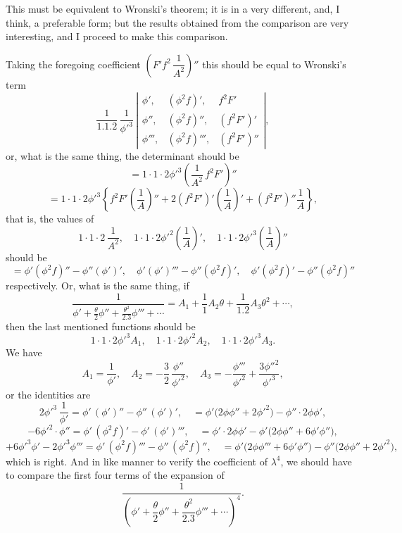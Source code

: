 \documentclass[11pt]{article}
\begin{document}
This must be equivalent to Wronski's theorem; it is in a very different, and, I think, a preferable form; but the results obtained from the comparison are very interesting, and I proceed to make this comparison.

Taking the foregoing coefficient $\left(F'f^{2}\,\dfrac{1}{A^{2}}\right)''$ this should be equal to Wronski's term
\[
\frac{1}{1.1.2}\,\frac{1}{\phi'^{3}}\,\left|\begin{array}{ccc}\phi',&(\phi^{2}f)',&f^{2}F'\\ \phi'',&(\phi^{2}f)'',&(f^{2}F')'\\ \phi''',&(\phi^{2}f)''',&(f^{2}F')''\end{array}\right|,
\]
or, what is the same thing, the determinant should be
\[
= 1\cdot 1\cdot 2\phi'^{3}\!\left(\frac{1}{A^{2}}\,f^{2}F'\right)''
\]
\[
= 1\cdot 1\cdot 2\phi'^{3}\!\left\{f^{2}F'\!\left(\frac{1}{A}\right)'' + 2(f^{2}F')'\!\left(\frac{1}{A}\right)' + (f^{2}F')''\!\frac{1}{A}\right\},
\]
that is, the values of
\[
1\cdot 1\cdot 2\,\frac{1}{A^{2}},\quad 1\cdot 1\cdot 2\phi'^{2}\!\left(\frac{1}{A}\right)',\quad 1\cdot 1\cdot 2\phi'^{3}\!\left(\frac{1}{A}\right)''
\]
should be
\[
= \phi'(\phi^{2}f)'' - \phi''(\phi')',\quad \phi'(\phi')''' - \phi''(\phi^{2}f)',\quad \phi'(\phi^{2}f)' - \phi''(\phi^{2}f)''
\]
respectively. Or, what is the same thing, if
\[
\frac{1}{\phi' + \tfrac{\theta}{2}\phi'' + \tfrac{\theta^{2}}{2.3}\phi''' + \cdots} = A_{1} + \frac{1}{1}A_{2}\theta + \frac{1}{1.2}A_{3}\theta^{2} + \cdots,
\]
then the last mentioned functions should be
\[
1\cdot 1\cdot 2\phi'^{3}A_{1},\quad 1\cdot 1\cdot 2\phi'^{2}A_{2},\quad 1\cdot 1\cdot 2\phi'^{3}A_{3}.
\]
We have
\[
A_{1} = \frac{1}{\phi'},\quad A_{2} = -\frac{3}{2}\,\frac{\phi''}{\phi'^{2}},\quad A_{3} = -\frac{\phi'''}{\phi'^{2}} + \frac{3\phi''^{2}}{\phi'^{3}},
\]
or the identities are
\[
2\phi'^{3}\,\frac{1}{\phi'} = \phi'\,(\phi')'' - \phi''\,(\phi')',\quad = \phi'\bigl(2\phi\phi'' + 2\phi'^{2}\bigr) - \phi''\cdot 2\phi\phi',
\]
\[
-6\phi'^{2}\!\cdot\!\phi'' = \phi'\,(\phi^{2}f)' - \phi'\,(\phi')''',\quad = \phi'\!\cdot\! 2\phi\phi' - \phi'\bigl(2\phi\phi'' + 6\phi'\phi''\bigr),
\]
\[
+6\phi'^{3}\!\phi' - 2\phi'^{3}\!\phi''' = \phi'\,(\phi^{2}f)''' - \phi''\,(\phi^{2}f)'',\quad = \phi'\bigl(2\phi\phi''' + 6\phi'\phi'' \bigr) - \phi''\bigl(2\phi\phi'' + 2\phi'^{2}\bigr),
\]
which is right. And in like manner to verify the coefficient of $\lambda^{4}$, we should have to compare the first four terms of the expansion of
\[
\frac{1}{\left(\phi' + \dfrac{\theta}{2}\phi'' + \dfrac{\theta^{2}}{2.3}\phi''' + \cdots\right)^{4}}.
\]
\end{document}
